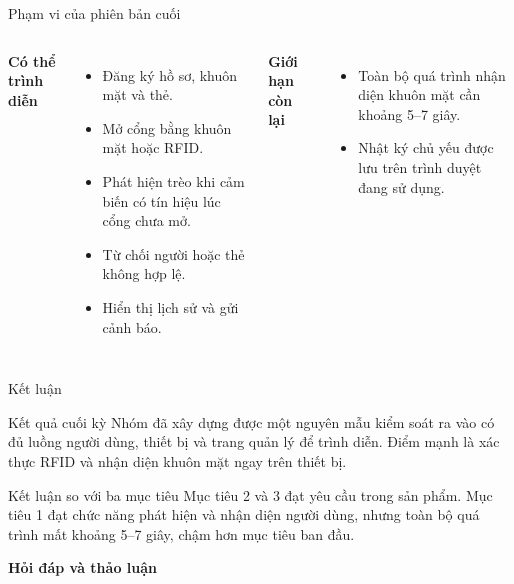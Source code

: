 \documentclass[aspectratio=169,11pt]{beamer}
\begin{document}
\begin{frame}{Phạm vi của phiên bản cuối}
  \vspace{1em}
  \begin{columns}[T,onlytextwidth]
      \textbf{Có thể trình diễn}
      \begin{itemize}
        \item Đăng ký hồ sơ, khuôn mặt và thẻ.
        \item Mở cổng bằng khuôn mặt hoặc RFID.
        \item Phát hiện trèo khi cảm biến có tín hiệu lúc cổng chưa mở.
        \item Từ chối người hoặc thẻ không hợp lệ.
        \item Hiển thị lịch sử và gửi cảnh báo.
      \end{itemize}

      \textbf{Giới hạn còn lại}
      \begin{itemize}
        \item Toàn bộ quá trình nhận diện khuôn mặt cần khoảng 5--7 giây.
        \item Nhật ký chủ yếu được lưu trên trình duyệt đang sử dụng.
      \end{itemize}
  \end{columns}
\end{frame}

\begin{frame}{Kết luận}
  \begin{block}{Kết quả cuối kỳ}
    Nhóm đã xây dựng được một nguyên mẫu kiểm soát ra vào có đủ luồng người dùng, thiết bị và trang quản lý để trình diễn. Điểm mạnh là xác thực RFID và nhận diện khuôn mặt ngay trên thiết bị.
  \end{block}

  \vspace{0.35em}
  \begin{alertblock}{Kết luận so với ba mục tiêu}
    Mục tiêu 2 và 3 đạt yêu cầu trong sản phẩm. Mục tiêu 1 đạt chức năng phát hiện và nhận diện người dùng, nhưng toàn bộ quá trình mất khoảng 5--7 giây, chậm hơn mục tiêu ban đầu.
  \end{alertblock}

  \vfill
  \centering
  {\Large\bfseries Hỏi đáp và thảo luận}
\end{frame}
\end{document}
